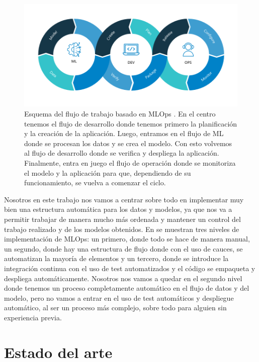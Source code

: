 \documentclass[a4paper,12pt,oneside,titlepage]{book}
\begin{document}
\begin{figure}[h!]
  \centering
  \includegraphics[scale=0.50]{mlops.PNG}
  \caption{Esquema del flujo de trabajo basado en MLOps \cite{mlops_neal}. En el centro tenemos el flujo de desarrollo donde tenemos primero la planificación y la creación de la aplicación. Luego, entramos en el flujo de ML donde se procesan los datos y se crea el modelo. Con esto volvemos al flujo de desarrollo donde se verifica y despliega la aplicación. Finalmente, entra en juego el flujo de operación donde se monitoriza el modelo y la aplicación para que, dependiendo de su funcionamiento, se vuelva a comenzar el ciclo.}
  \label{fig:mlops}
\end{figure}

Nosotros en este trabajo nos vamos a centrar sobre todo en implementar muy bien una estructura automática para los datos y modelos, ya que nos va a permitir trabajar de manera mucho más ordenada y mantener un control del trabajo realizado y de los modelos obtenidos. En \cite{mlops_begin} se muestran tres niveles de implementación de MLOps: un primero, donde todo se hace de manera manual, un segundo, donde hay una estructura de flujo donde con el uso de cauces, se automatizan la mayoría de elementos y un tercero, donde se introduce la integración continua con el uso de test automatizados y el código se empaqueta y despliega automáticamente. Nosotros nos vamos a quedar en el segundo nivel donde tenemos un proceso completamente automático en el flujo de datos y del modelo, pero no vamos a entrar en el uso de test automáticos y despliegue automático, al ser un proceso más complejo, sobre todo para alguien sin experiencia previa.

\section{Estado del arte}
\end{document}
